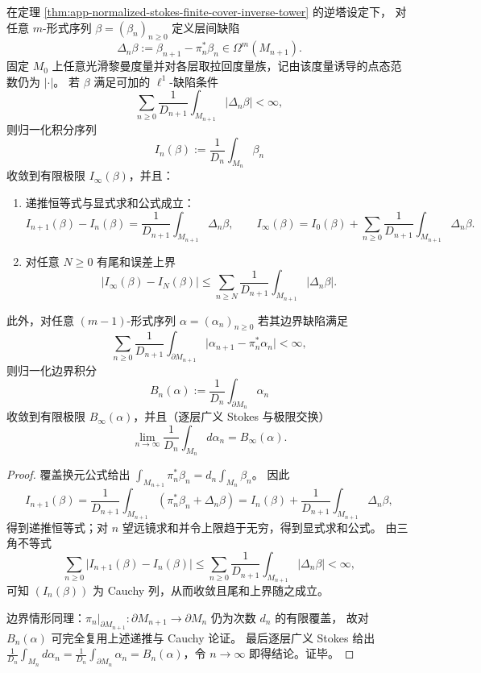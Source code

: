 \begin{theorem}\label{thm:app-normalized-integration-l1-defect-inverse-tower}
在定理 \ref{thm:app-normalized-stokes-finite-cover-inverse-tower} 的逆塔设定下，
对任意 \(m\)-形式序列 \(\beta=(\beta_n)_{n\ge 0}\) 定义层间缺陷
\[
\Delta_n\beta:=\beta_{n+1}-\pi_n^\ast\beta_n\in\Omega^m(M_{n+1}).
\]
固定 \(M_0\) 上任意光滑黎曼度量并对各层取拉回度量族，记由该度量诱导的点态范数仍为 \(|\cdot|\)。
若 \(\beta\) 满足可加的 \(\ell^1\)-缺陷条件
\[
\sum_{n\ge 0}\frac{1}{D_{n+1}}\int_{M_{n+1}}|\Delta_n\beta|<\infty,
\]
则归一化积分序列
\[
I_n(\beta):=\frac{1}{D_n}\int_{M_n}\beta_n
\]
收敛到有限极限 \(I_\infty(\beta)\)，并且：
\begin{enumerate}
  \item 递推恒等式与显式求和公式成立：
  \[
  I_{n+1}(\beta)-I_n(\beta)=\frac{1}{D_{n+1}}\int_{M_{n+1}}\Delta_n\beta,
  \qquad
  I_\infty(\beta)=I_0(\beta)+\sum_{n\ge 0}\frac{1}{D_{n+1}}\int_{M_{n+1}}\Delta_n\beta.
  \]
  \item 对任意 \(N\ge 0\) 有尾和误差上界
  \[
  \bigl|I_\infty(\beta)-I_N(\beta)\bigr|
  \le
  \sum_{n\ge N}\frac{1}{D_{n+1}}\int_{M_{n+1}}|\Delta_n\beta|.
  \]
\end{enumerate}
此外，对任意 \((m-1)\)-形式序列 \(\alpha=(\alpha_n)_{n\ge 0}\) 若其边界缺陷满足
\[
\sum_{n\ge 0}\frac{1}{D_{n+1}}\int_{\partial M_{n+1}}\bigl|\alpha_{n+1}-\pi_n^\ast\alpha_n\bigr|<\infty,
\]
则归一化边界积分
\[
B_n(\alpha):=\frac{1}{D_n}\int_{\partial M_n}\alpha_n
\]
收敛到有限极限 \(B_\infty(\alpha)\)，并且（逐层广义 Stokes 与极限交换）
\[
\lim_{n\to\infty}\frac{1}{D_n}\int_{M_n}d\alpha_n
=
B_\infty(\alpha).
\]
\end{theorem}

\begin{proof}
覆盖换元公式给出
\(
\int_{M_{n+1}}\pi_n^\ast\beta_n=d_n\int_{M_n}\beta_n
\)。
因此
\[
I_{n+1}(\beta)
=\frac{1}{D_{n+1}}\int_{M_{n+1}}(\pi_n^\ast\beta_n+\Delta_n\beta)
=I_n(\beta)+\frac{1}{D_{n+1}}\int_{M_{n+1}}\Delta_n\beta,
\]
得到递推恒等式；对 \(n\) 望远镜求和并令上限趋于无穷，得到显式求和公式。
由三角不等式
\[
\sum_{n\ge 0}\bigl|I_{n+1}(\beta)-I_n(\beta)\bigr|
\le
\sum_{n\ge 0}\frac{1}{D_{n+1}}\int_{M_{n+1}}|\Delta_n\beta|<\infty,
\]
可知 \((I_n(\beta))\) 为 Cauchy 列，从而收敛且尾和上界随之成立。
\par
边界情形同理：\(\pi_n|_{\partial M_{n+1}}:\partial M_{n+1}\to\partial M_n\) 仍为次数 \(d_n\) 的有限覆盖，
故对 \(B_n(\alpha)\) 可完全复用上述递推与 Cauchy 论证。
最后逐层广义 Stokes 给出
\(
\frac{1}{D_n}\int_{M_n}d\alpha_n=\frac{1}{D_n}\int_{\partial M_n}\alpha_n=B_n(\alpha)
\)，令 \(n\to\infty\) 即得结论。证毕。
\end{proof}

